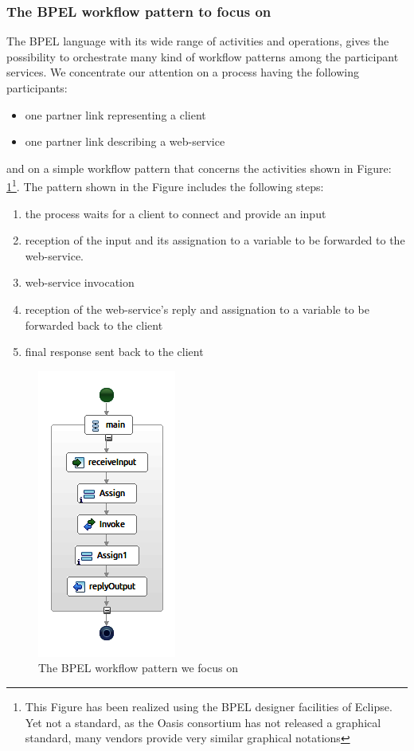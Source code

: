 \subsubsection{The BPEL workflow pattern to focus on}
\label{sec:DesignBPELPattern}
The BPEL language with its wide range of activities and operations, gives the possibility to orchestrate many kind of workflow patterns among the participant services. We concentrate our attention on a process having the following participants:
\begin{itemize}
 \item one partner link representing a client
 \item one partner link describing a web-service
\end{itemize}
and on a simple workflow pattern that concerns the activities shown in Figure: \ref{fig:BPELWorkflowPattern}\footnote{This Figure has been realized using the BPEL designer facilities of Eclipse. Yet not a standard, as the Oasis consortium has not released a graphical standard, many vendors provide very similar graphical notations}. The pattern shown in the Figure includes the following steps:
\begin{enumerate}
 \item the process waits for a client to connect and provide an input
\item reception of the input and its assignation to a variable to be forwarded to the web-service.
\item web-service invocation
\item reception of the web-service's reply and assignation to a variable to be forwarded back to the client
\item final response sent back to the client
\end{enumerate}


\begin{figure}
  \begin{center}
    \includegraphics[scale=0.8]{pictures/SimpleProcessBPEL.png}
    \caption{The BPEL workflow pattern we focus on}
    \label{fig:BPELWorkflowPattern}
  \end{center}
\end{figure} 

